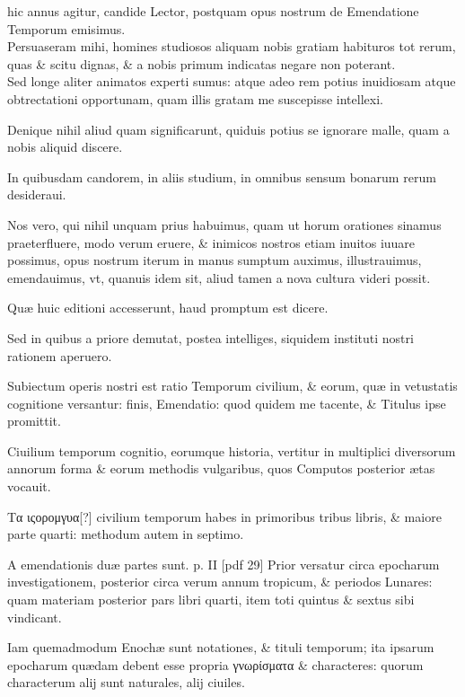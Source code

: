 \setcounter{parcount}{0}
\begin{parnumbers}
 hic annus agitur, candide Lector, postquam opus nostrum de Emendatione Temporum emisimus.
\\ \p
Persuaseram mihi, homines studiosos aliquam nobis gratiam habituros tot rerum, quas \& scitu dignas, \& a nobis primum indicatas negare non poterant.
\\ \p
Sed longe aliter animatos experti sumus: atque adeo rem potius inuidiosam atque obtrectationi opportunam, quam illis gratam me suscepisse intellexi.

Denique nihil aliud quam significarunt, quiduis potius se ignorare malle, quam a nobis aliquid discere.

In quibusdam candorem, in aliis studium, in omnibus sensum bonarum rerum desideraui.

Nos vero, qui nihil unquam prius habuimus, quam ut horum orationes sinamus praeterfluere, modo verum eruere, \& inimicos nostros etiam inuitos iuuare possimus, opus nostrum iterum in manus sumptum auximus, illustrauimus, emendauimus, vt, quanuis idem sit, aliud tamen a nova cultura videri possit.

Quæ huic editioni accesserunt, haud promptum est dicere.

Sed in quibus a priore demutat, postea intelliges, siquidem instituti nostri rationem aperuero.

Subiectum operis nostri est ratio Temporum civilium, \& eorum, quæ in vetustatis cognitione versantur: finis, Emendatio: quod quidem me tacente, \& Titulus ipse promittit.

Ciuilium temporum cognitio, eorumque historia, vertitur in multiplici diversorum annorum forma \& eorum methodis vulgaribus, quos Computos posterior ætas vocauit.

\textgreek{Τα ιςορομγυα[?]} civilium temporum habes in primoribus tribus libris, \& maiore parte quarti: methodum autem in septimo.

A emendationis duæ partes sunt.
\clearpage
p. II [pdf 29]
Prior versatur circa epocharum investigationem, posterior circa verum annum tropicum, 
\& periodos Lunares: quam materiam posterior pars libri quarti, item toti quintus \& sextus sibi vindicant.

Iam quemadmodum Enochæ sunt notationes, \& tituli temporum; ita ipsarum epocharum quædam debent esse propria \textgreek{γνωρίσματα} \& characteres: quorum characterum alij sunt naturales, alij ciuiles. 


\end{parnumbers}
